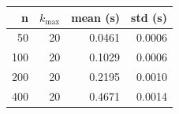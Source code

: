 \begin{tabular}{rrrr}\toprule
n & $k_{\max}$ & mean (s) & std (s)\\\midrule
50 & 20 & 0.0461 & 0.0006\\
100 & 20 & 0.1029 & 0.0006\\
200 & 20 & 0.2195 & 0.0010\\
400 & 20 & 0.4671 & 0.0014\\
\bottomrule\end{tabular}
